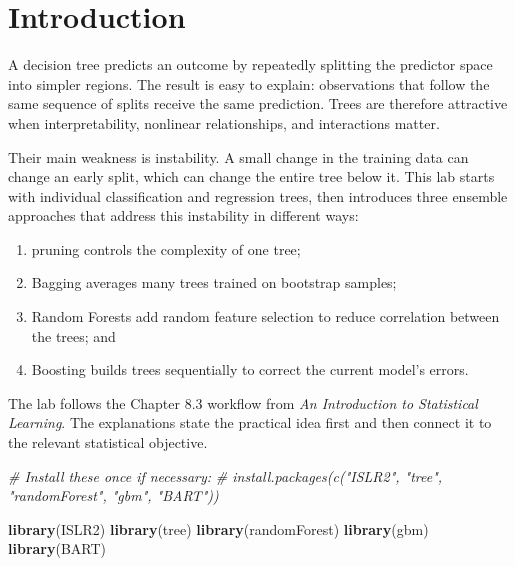 \documentclass[
  11pt,
]{article}
\author{}
\date{\vspace{-2.5em}}
\newenvironment{Shaded}{\begin{snugshade}}{\end{snugshade}}
\newcommand{\CommentTok}[1]{\textcolor[rgb]{0.56,0.35,0.01}{\textit{#1}}}
\newcommand{\FunctionTok}[1]{\textcolor[rgb]{0.13,0.29,0.53}{\textbf{#1}}}
\newcommand{\NormalTok}[1]{#1}
\providecommand{\tightlist}{%
  \setlength{\itemsep}{0pt}\setlength{\parskip}{0pt}}
\begin{document}

\section{Introduction}\label{introduction}

A decision tree predicts an outcome by repeatedly splitting the
predictor space into simpler regions. The result is easy to explain:
observations that follow the same sequence of splits receive the same
prediction. Trees are therefore attractive when interpretability,
nonlinear relationships, and interactions matter.

Their main weakness is instability. A small change in the training data
can change an early split, which can change the entire tree below it.
This lab starts with individual classification and regression trees,
then introduces three ensemble approaches that address this instability
in different ways:

\begin{enumerate}
\def\labelenumi{\arabic{enumi}.}
\tightlist
\item
  pruning controls the complexity of one tree;
\item
  Bagging averages many trees trained on bootstrap samples;
\item
  Random Forests add random feature selection to reduce correlation
  between the trees; and
\item
  Boosting builds trees sequentially to correct the current model's
  errors.
\end{enumerate}

The lab follows the Chapter 8.3 workflow from \emph{An Introduction to
Statistical Learning}. The explanations state the practical idea first
and then connect it to the relevant statistical objective.

\begin{Shaded}
\begin{Highlighting}[]
\CommentTok{\# Install these once if necessary:}
\CommentTok{\# install.packages(c("ISLR2", "tree", "randomForest", "gbm", "BART"))}

\FunctionTok{library}\NormalTok{(ISLR2)}
\FunctionTok{library}\NormalTok{(tree)}
\FunctionTok{library}\NormalTok{(randomForest)}
\FunctionTok{library}\NormalTok{(gbm)}
\FunctionTok{library}\NormalTok{(BART)}
\end{Highlighting}
\end{Shaded}
\end{document}
